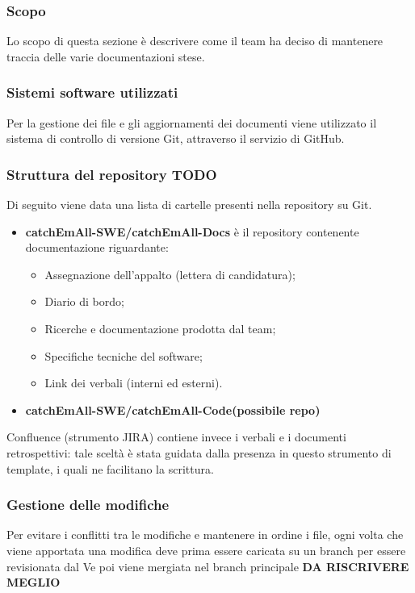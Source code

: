 \subsubsection{Scopo}
Lo scopo di questa sezione è descrivere come il team ha deciso di mantenere traccia delle varie documentazioni stese.

\subsubsection{Sistemi software utilizzati}
Per la gestione dei file e gli aggiornamenti dei documenti viene utilizzato il sistema di controllo di versione Git, attraverso il servizio di GitHub.

\subsubsection{Struttura del repository TODO}
Di seguito viene data una lista di cartelle presenti nella repository su Git.
\begin{itemize}
\item \textbf{catchEmAll-SWE/catchEmAll-Docs} è il repository contenente documentazione riguardante:
\begin{itemize}
    \item Assegnazione dell'appalto (lettera di candidatura);
    \item Diario di bordo;
    \item Ricerche e documentazione prodotta dal team;
    \item Specifiche tecniche del software;
    \item Link dei verbali (interni ed esterni).
\end{itemize}
\item \textbf{catchEmAll-SWE/catchEmAll-Code(possibile repo)}
\end{itemize}
Confluence (strumento JIRA) contiene invece i verbali e i documenti retrospettivi: tale sceltà è stata guidata dalla presenza in questo strumento di template, i quali ne facilitano la scrittura.

\subsubsection{Gestione delle modifiche}
Per evitare i conflitti tra le modifiche e mantenere in ordine i file, ogni volta che viene apportata una modifica deve prima essere caricata su un branch per essere revisionata dal Ve poi viene mergiata nel branch principale \textbf{DA RISCRIVERE MEGLIO }

